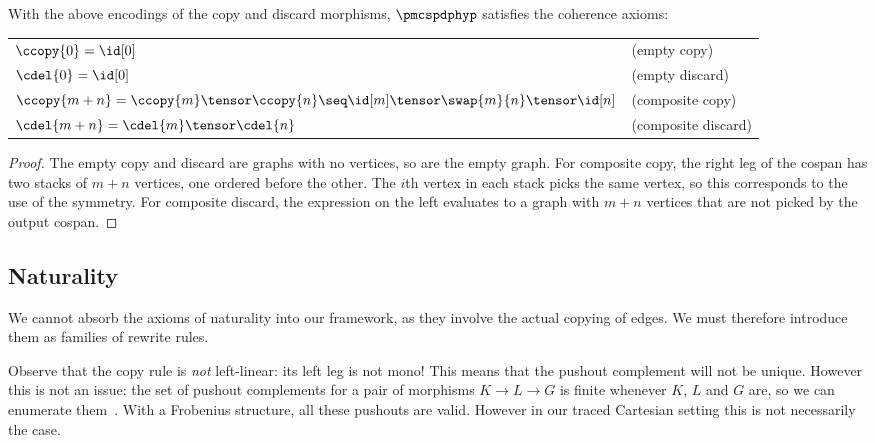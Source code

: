 \documentclass[10pt]{article}
\begin{document}
\begin{proposition}
    With the above encodings of the copy and discard morphisms, $\pmcspdphyp$ satisfies the coherence axioms:
    \begin{center}
        \begin{tabular}{l l}
            $\ccopy{0} = \id[0]$ & (empty copy) \\
            $\cdel{0} = \id[0]$ & (empty discard) \\
            $\ccopy{m + n} = \ccopy{m} \tensor \ccopy{n} \seq \id[m] \tensor \swap{m}{n} \tensor \id[n]$ & (composite copy) \\
            $\cdel{m + n} = \cdel{m} \tensor \cdel{n}$ & (composite discard)
        \end{tabular}
    \end{center}
\end{proposition}
\begin{proof}
    The empty copy and discard are graphs with no vertices, so are the empty graph.
    For composite copy, the right leg of the cospan has two stacks of $m + n$ vertices, one ordered before the other.
    The $i$th vertex in each stack picks the same vertex, so this corresponds to the use of the symmetry.
    For composite discard, the expression on the left evaluates to a graph with $m + n$ vertices that are not picked by the output cospan.
\end{proof}

\subsection{Naturality}

We cannot absorb the axioms of naturality into our framework, as they involve the actual copying of edges.
We must therefore introduce them as families of rewrite rules.

\begin{center}
    
    \qquad
    \raisebox{0.5em}{}
\end{center}

\noindent Observe that the copy rule is \emph{not} left-linear: its left leg is not mono!
This means that the pushout complement will not be unique.
However this is not an issue: the set of pushout complements for a pair of morphisms $K \to L \to G$ is finite whenever $K$, $L$ and $G$ are, so we can enumerate them~\cite{heumuller2011construction,bonchi2020string}.
With a Frobenius structure, all these pushouts are valid.
However in our traced Cartesian setting this is not necessarily the case.
\end{document}
